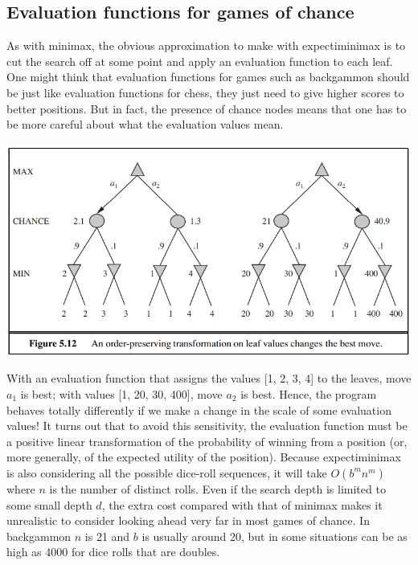 \subsection{Evaluation functions for games of chance}
As with minimax, the obvious approximation to make with expectiminimax is to cut the search off at some point and apply an evaluation function to each leaf. One might think that evaluation functions for games such as backgammon should be just like evaluation functions for chess, they just need to give higher scores to better positions. But in fact, the presence of chance nodes means that one has to be more careful about what the evaluation values mean.
\begin{center}
    \includegraphics[]{images/eval-stoch-games.png}
\end{center}
With an evaluation function that assigns the values [1, 2,
3, 4] to the leaves, move $a_1$ is best; with values [1, 20, 30, 400], move $a_2$ is best. Hence, the program behaves totally differently if we make a change in the scale of some evaluation values! It turns out that to avoid this sensitivity, the evaluation function must be a positive linear transformation of the probability of winning from a position (or, more generally, of the expected utility of the position).\newline\newline
Because expectiminimax is also considering all the possible dice-roll sequences, it will take $O(b^m n^m)$ where $n$ is the number of distinct rolls. Even if the search depth is limited to some small depth $d$, the extra cost compared with that of minimax makes it unrealistic to consider looking ahead very far in most games of chance.  In backgammon $n$ is 21 and $b$ is usually around 20, but in some situations can be as high as 4000 for dice rolls that are doubles.

